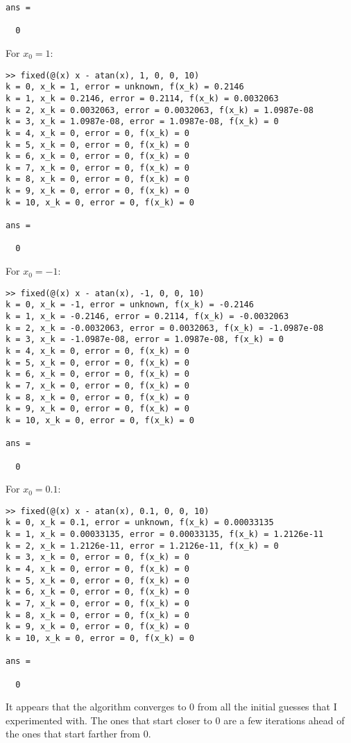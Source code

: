 \documentclass{homework}
\begin{document}
\begin{alphaparts}
\begin{lstlisting}[basicstyle=\small\ttfamily, frame=single]
ans =

  0
  	\end{lstlisting}
  	For $x_0 = 1$:
  	\begin{lstlisting}[basicstyle=\small\ttfamily, frame=single]
>> fixed(@(x) x - atan(x), 1, 0, 0, 10)
k = 0, x_k = 1, error = unknown, f(x_k) = 0.2146
k = 1, x_k = 0.2146, error = 0.2114, f(x_k) = 0.0032063
k = 2, x_k = 0.0032063, error = 0.0032063, f(x_k) = 1.0987e-08
k = 3, x_k = 1.0987e-08, error = 1.0987e-08, f(x_k) = 0
k = 4, x_k = 0, error = 0, f(x_k) = 0
k = 5, x_k = 0, error = 0, f(x_k) = 0
k = 6, x_k = 0, error = 0, f(x_k) = 0
k = 7, x_k = 0, error = 0, f(x_k) = 0
k = 8, x_k = 0, error = 0, f(x_k) = 0
k = 9, x_k = 0, error = 0, f(x_k) = 0
k = 10, x_k = 0, error = 0, f(x_k) = 0

ans =

  0
  	\end{lstlisting}
  	For $x_0 = -1$:
  	\begin{lstlisting}[basicstyle=\small\ttfamily, frame=single]
>> fixed(@(x) x - atan(x), -1, 0, 0, 10)
k = 0, x_k = -1, error = unknown, f(x_k) = -0.2146
k = 1, x_k = -0.2146, error = 0.2114, f(x_k) = -0.0032063
k = 2, x_k = -0.0032063, error = 0.0032063, f(x_k) = -1.0987e-08
k = 3, x_k = -1.0987e-08, error = 1.0987e-08, f(x_k) = 0
k = 4, x_k = 0, error = 0, f(x_k) = 0
k = 5, x_k = 0, error = 0, f(x_k) = 0
k = 6, x_k = 0, error = 0, f(x_k) = 0
k = 7, x_k = 0, error = 0, f(x_k) = 0
k = 8, x_k = 0, error = 0, f(x_k) = 0
k = 9, x_k = 0, error = 0, f(x_k) = 0
k = 10, x_k = 0, error = 0, f(x_k) = 0

ans =

  0
  	\end{lstlisting}
  	For $x_0 = 0.1$: 
	\begin{lstlisting}[basicstyle=\small\ttfamily, frame=single]
>> fixed(@(x) x - atan(x), 0.1, 0, 0, 10)
k = 0, x_k = 0.1, error = unknown, f(x_k) = 0.00033135
k = 1, x_k = 0.00033135, error = 0.00033135, f(x_k) = 1.2126e-11
k = 2, x_k = 1.2126e-11, error = 1.2126e-11, f(x_k) = 0
k = 3, x_k = 0, error = 0, f(x_k) = 0
k = 4, x_k = 0, error = 0, f(x_k) = 0
k = 5, x_k = 0, error = 0, f(x_k) = 0
k = 6, x_k = 0, error = 0, f(x_k) = 0
k = 7, x_k = 0, error = 0, f(x_k) = 0
k = 8, x_k = 0, error = 0, f(x_k) = 0
k = 9, x_k = 0, error = 0, f(x_k) = 0
k = 10, x_k = 0, error = 0, f(x_k) = 0

ans =

  0
	\end{lstlisting}
	
	\questionpart It appears that the algorithm converges to $0$ from all the initial guesses that I experimented with. The ones that start closer to $0$ are a few iterations ahead of the ones that start farther from $0$.
	

\end{alphaparts}
\end{document}
